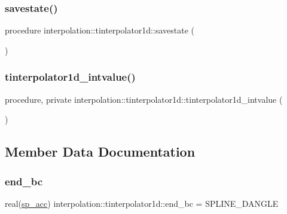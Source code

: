 \subsubsection{\texorpdfstring{savestate()}{savestate()}}
{\footnotesize\ttfamily procedure interpolation\+::tinterpolator1d\+::savestate (\begin{DoxyParamCaption}{ }\end{DoxyParamCaption})}

\mbox{\label{structinterpolation_1_1tinterpolator1d_a07c4f3b0afea2911b57b6c900387e5cf}} 
\subsubsection{\texorpdfstring{tinterpolator1d\+\_\+intvalue()}{tinterpolator1d\_intvalue()}}
{\footnotesize\ttfamily procedure, private interpolation\+::tinterpolator1d\+::tinterpolator1d\+\_\+intvalue (\begin{DoxyParamCaption}{ }\end{DoxyParamCaption})\hspace{0.3cm}{\ttfamily [private]}}



\subsection{Member Data Documentation}
\mbox{\label{structinterpolation_1_1tinterpolator1d_a103246ea154b2ac29b65f270e078e3a7}} 
\subsubsection{\texorpdfstring{end\+\_\+bc}{end\_bc}}
{\footnotesize\ttfamily real(\mbox{\hyperlink{namespaceinterpolation_af72aa9a05feb8ef90b2d26e4a013abf3}{sp\+\_\+acc}}) interpolation\+::tinterpolator1d\+::end\+\_\+bc = S\+P\+L\+I\+N\+E\+\_\+\+D\+A\+N\+G\+LE}


